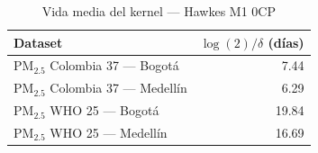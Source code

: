 \begin{table}[htbp]
\centering
\caption{Vida media del kernel --- Hawkes M1 0CP}
\label{tab:hawkes_halflife_0cp}
\begin{tabular}{lr}
\toprule
Dataset & $\log(2)/\delta$ (d\'{i}as) \\
\midrule
PM$_{2.5}$ Colombia 37 --- Bogot\'{a} & 7.44 \\
PM$_{2.5}$ Colombia 37 --- Medell\'{i}n & 6.29 \\
PM$_{2.5}$ WHO 25 --- Bogot\'{a} & 19.84 \\
PM$_{2.5}$ WHO 25 --- Medell\'{i}n & 16.69 \\
\bottomrule
\end{tabular}
\end{table}
